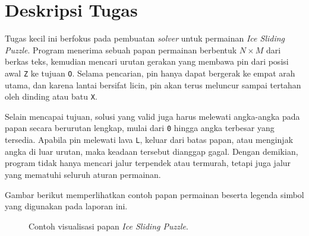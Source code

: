 \section{Deskripsi Tugas}

Tugas kecil ini berfokus pada pembuatan \textit{solver} untuk permainan \textit{Ice Sliding Puzzle}. Program menerima sebuah papan permainan berbentuk $N \times M$ dari berkas teks, kemudian mencari urutan gerakan yang membawa pin dari posisi awal \texttt{Z} ke tujuan \texttt{O}. Selama pencarian, pin hanya dapat bergerak ke empat arah utama, dan karena lantai bersifat licin, pin akan terus meluncur sampai tertahan oleh dinding atau batu \texttt{X}.

Selain mencapai tujuan, solusi yang valid juga harus melewati angka-angka pada papan secara berurutan lengkap, mulai dari \texttt{0} hingga angka terbesar yang tersedia. Apabila pin melewati lava \texttt{L}, keluar dari batas papan, atau menginjak angka di luar urutan, maka keadaan tersebut dianggap gagal. Dengan demikian, program tidak hanya mencari jalur terpendek atau termurah, tetapi juga jalur yang mematuhi seluruh aturan permainan.

Gambar berikut memperlihatkan contoh papan permainan beserta legenda simbol yang digunakan pada laporan ini.

\begin{figure}[H]
    \centering
    \caption{Contoh visualisasi papan \textit{Ice Sliding Puzzle}.}
    \label{fig:contoh-papan-ice-sliding}
\end{figure}

